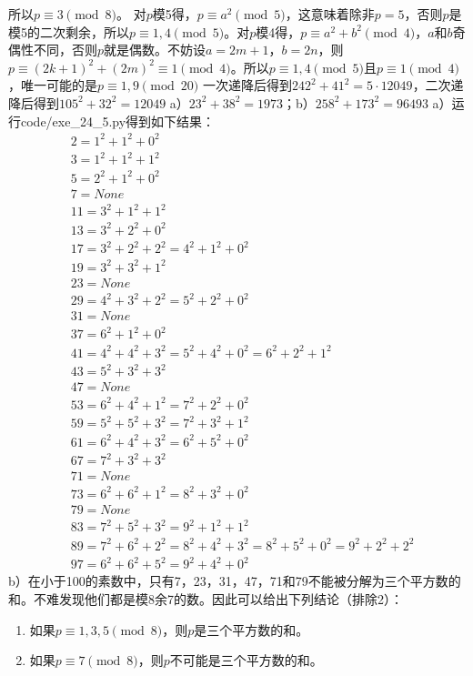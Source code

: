 所以$p\equiv3\pmod8$。
%
\exercise 对$p$模5得，$p\equiv a^2\pmod5$，这意味着除非$p=5$，否则$p$是模5的二次剩余，所以$p\equiv1,4\pmod5$。对$p$模4得，$p\equiv a^2+b^2\pmod4$，$a$和$b$奇偶性不同，否则$p$就是偶数。不妨设$a=2m+1$，$b=2n$，则$p\equiv (2k+1)^2+(2m)^2\equiv1\pmod4$。所以$p\equiv1,4\pmod5$且$p\equiv1\pmod4$，唯一可能的是$p\equiv1,9\pmod {20}$
%
\exercise 一次递降后得到$242^2+41^2=5·12049$，二次递降后得到$105^2+32^2=12049$
%
\exercise a）$23^2+38^2=1973$；b）$258^2+173^2=96493$
%
\exercise a）运行code/exe\_24\_5.py得到如下结果：
\begin{align*} 
    &2=1^2+1^2+0^2\\
    &3=1^2+1^2+1^2\\
    &5=2^2+1^2+0^2\\
    &7=None\\
    &11=3^2+1^2+1^2\\
    &13=3^2+2^2+0^2\\
    &17=3^2+2^2+2^2=4^2+1^2+0^2\\
    &19=3^2+3^2+1^2\\
    &23=None\\
    &29=4^2+3^2+2^2=5^2+2^2+0^2\\
    &31=None\\
    &37=6^2+1^2+0^2\\
    &41=4^2+4^2+3^2=5^2+4^2+0^2=6^2+2^2+1^2\\
    &43=5^2+3^2+3^2\\
    &47=None\\
    &53=6^2+4^2+1^2=7^2+2^2+0^2\\
    &59=5^2+5^2+3^2=7^2+3^2+1^2\\
    &61=6^2+4^2+3^2=6^2+5^2+0^2\\
    &67=7^2+3^2+3^2\\
    &71=None\\
    &73=6^2+6^2+1^2=8^2+3^2+0^2\\
    &79=None\\
    &83=7^2+5^2+3^2=9^2+1^2+1^2\\
    &89=7^2+6^2+2^2=8^2+4^2+3^2=8^2+5^2+0^2=9^2+2^2+2^2\\
    &97=6^2+6^2+5^2=9^2+4^2+0^2
\end{align*}
b）在小于100的素数中，只有7，23，31，47，71和79不能被分解为三个平方数的和。不难发现他们都是模8余7的数。因此可以给出下列结论（排除2）：
\begin{enumerate}
    \item 如果$p\equiv 1,3,5\pmod8$，则$p$是三个平方数的和。
    \item 如果$p\equiv 7\pmod8$，则$p$不可能是三个平方数的和。
\end{enumerate}
